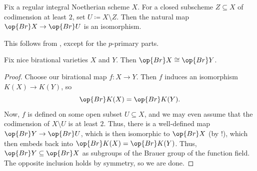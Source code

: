\documentclass[../notes.tex]{subfiles}
\begin{document}
\begin{theorem} \label{thm:brauer-purity}
	Fix a regular integral Noetherian scheme $X$. For a closed subscheme $Z\subseteq X$ of codimension at least $2$, set $U\coloneqq X\setminus Z$. Then the natural map $\op{Br}X\to\op{Br}U$ is an isomorphism.
\end{theorem}
\begin{remark}
	This follows from , except for the $p$-primary parts.
\end{remark}
\begin{corollary} \label{cor:birational-vars}
	Fix nice birational varieties $X$ and $Y$. Then $\op{Br}X\cong\op{Br}Y$.
\end{corollary}
\begin{proof}
	Choose our birational map $f\colon X\to Y$. Then $f$ induces an isomorphism $K(X)\to K(Y)$, so
	\[\op{Br}K(X)=\op{Br}K(Y).\]
	Now, $f$ is defined on some open subset $U\subseteq X$, and we may even assume that the codimension of $X\setminus U$ is at least $2$. Thus, there is a well-defined map $\op{Br}Y\to\op{Br}U$, which is then isomorphic to $\op{Br}X$ (by !), which then embeds back into $\op{Br}K(X)=\op{Br}K(Y)$. Thus, $\op{Br}Y\subseteq\op{Br}X$ as subgroups of the Brauer group of the function field. The opposite inclusion holds by symmetry, so we are done.
\end{proof}
\end{document}
